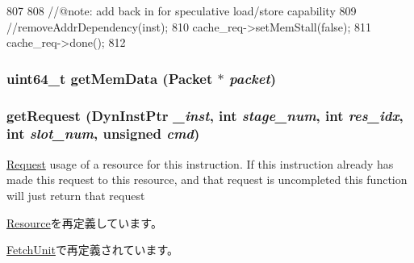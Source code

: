 \begin{DoxyCode}
807 {
808     //@note: add back in for speculative load/store capability
809     //removeAddrDependency(inst);
810     cache_req->setMemStall(false);
811     cache_req->done();
812 }
\end{DoxyCode}
\hypertarget{classCacheUnit_a1325b5bcdbbf4f0ba799cdda17265b72}{
\subsubsection[{getMemData}]{\setlength{\rightskip}{0pt plus 5cm}uint64\_\-t getMemData ({\bf Packet} $\ast$ {\em packet})}}
\label{classCacheUnit_a1325b5bcdbbf4f0ba799cdda17265b72}
\hypertarget{classCacheUnit_aae5ce84f94a1057d7f60172daf5d731d}{
\subsubsection[{getRequest}]{ getRequest ({\bf DynInstPtr} {\em \_\-inst}, \/  int {\em stage\_\-num}, \/  int {\em res\_\-idx}, \/  int {\em slot\_\-num}, \/  unsigned {\em cmd})}}
\label{classCacheUnit_aae5ce84f94a1057d7f60172daf5d731d}
\hyperlink{classRequest}{Request} usage of a resource for this instruction. If this instruction already has made this request to this resource, and that request is uncompleted this function will just return that request 

\hyperlink{classResource_aae5ce84f94a1057d7f60172daf5d731d}{Resource}を再定義しています。

\hyperlink{classFetchUnit_aae5ce84f94a1057d7f60172daf5d731d}{FetchUnit}で再定義されています。


